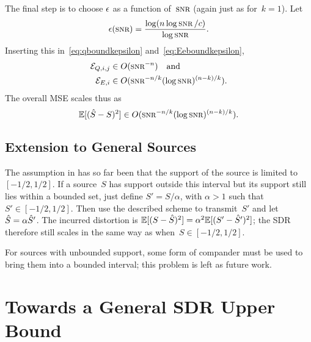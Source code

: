 The final step is to choose $\epsilon$ as a function of~$\snr$ (again just as
for~$k=1$). Let
\begin{equation*}
  \e(\snr) = \frac{\log(n \log\snr / c)}{\log\snr}.
\end{equation*}
Inserting this in~\eqref{eq:qboundkepsilon} and~\eqref{eq:Eeboundkepsilon}, 
\begin{align*}
  \Err_{Q,i,j} &\in O(\snr^{-n}) \quad\text{and} \\
  \Err_{E,i} &\in O(\snr^{-n/k} (\log\snr)^{(n-k)/k}).
\end{align*}
The overall MSE scales thus as
\begin{equation*}
  \mse \in O(\snr^{-n/k} (\log\snr)^{(n-k)/k}).
\end{equation*}


\subsection{Extension to General Sources}\label{sec:extgensources}

The assumption in  has so far been that the support of the
source is limited to~$[-1/2,1/2]$. If a source~$S$ has support outside this
interval but its support still lies within a bounded set, just define $S' =
S/\alpha$, with $\alpha > 1$ such that $S' \in [-1/2, 1/2]$. Then use
the described scheme to transmit~$S'$ and let ${\hat{S}} = \alpha {\hat{S}}'$. The
incurred distortion is $\mathbb{E}[(S - {\hat{S}})^2] = \alpha^2 \mathbb{E}[(S' - {\hat{S}}')^2]$; the SDR
therefore still scales in the same way as when~$S \in [-1/2, 1/2]$.

For sources with unbounded support, some form of compander must be used to bring
them into a bounded interval; this problem is left as future work. 





\section{Towards a General SDR Upper Bound}\label{sec:gensdrub}






